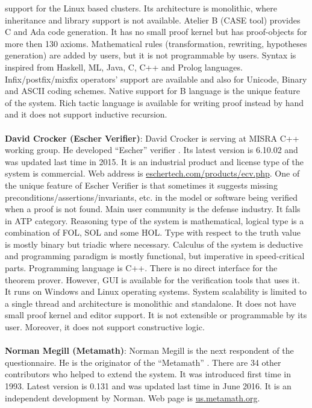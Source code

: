 support for the Linux based clusters. Its architecture is monolithic, where inheritance and library
support is not available. Atelier B (CASE tool) provides C and Ada code generation. 
It has no small proof kernel but has proof-objects for more then 130 axioms. Mathematical rules (transformation, rewriting, hypotheses generation) 
are added by users, but it is not programmable by users. Syntax is inspired from Haskell, ML, Java, C, C++ and Prolog languages. 
Infix/postfix/mixfix operators' support are available and also for Unicode, Binary and ASCII coding schemes. Native support for B 
language is the unique feature of the system. Rich tactic language is available for writing proof instead by hand and it does not support inductive 
recursion.
\\\\
{\bf David Crocker (Escher Verifier)}: 
David Crocker is serving at MISRA C++ working group. He developed ``Escher'' verifier . Its latest version is 6.10.02 and 
was updated last time in 2015. It is an industrial product and license type of the system is commercial. Web address is 
\url{eschertech.com/products/ecv.php}. One of the unique feature of Escher Verifier is that sometimes it 
suggests missing preconditions/assertions/invariants, etc. in the model 
or software being verified when a proof is not found. Main user community is the
defense industry. It falls in ATP category. Reasoning type of the system is mathematical, logical type is a combination of FOL, SOL 
and some HOL. Type with respect to the truth value is mostly binary but triadic where necessary. Calculus of the system is
deductive and programming paradigm is mostly functional, but imperative in speed-critical parts. Programming language is
C++. There is no direct interface for the theorem prover. However, GUI is available for the verification tools that uses it. It runs on Windows
and Linux operating systems. System scalability is limited to a single thread and architecture is monolithic and standalone. 
It does not have small proof kernel and editor support. It is not extensible or programmable by its user. Moreover, it does not support
constructive logic. 
\\\\
{\bf Norman Megill (Metamath)}:
Norman Megill is the next respondent of the questionnaire. He is the originator of the ``Metamath'' . There are 34 other 
contributors who helped to extend the system. It was introduced first time in 1993. Latest version is 0.131 and was updated 
last time in June 2016. It is an independent development by Norman. Web page is \url{us.metamath.org}.

